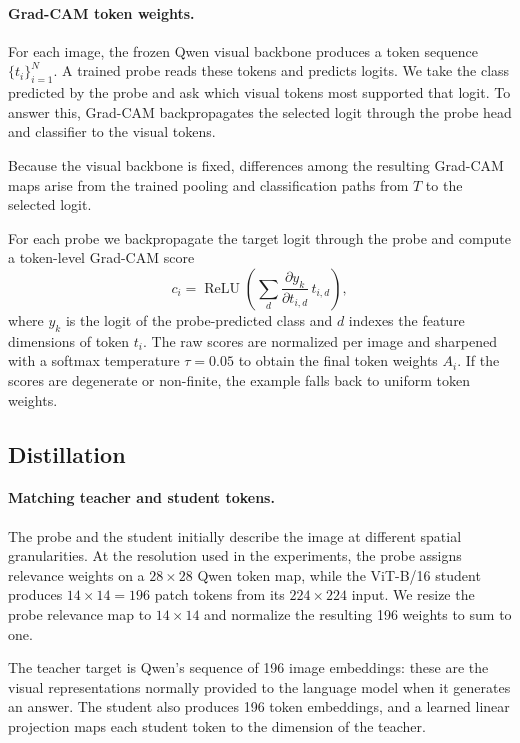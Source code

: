 \paragraph{Grad-CAM token weights.}
For each image, the frozen Qwen visual backbone produces a token sequence $\{t_i\}_{i=1}^N$.
A trained probe reads these tokens and predicts logits.
We take the class predicted by the probe and ask which visual tokens most supported that logit.
To answer this, Grad-CAM backpropagates the selected logit through the probe head and classifier to the visual tokens.

Because the visual backbone is fixed, differences among the resulting Grad-CAM maps arise from the trained pooling and classification paths from $T$ to the selected logit.

For each probe we backpropagate the target logit through the probe and compute a token-level Grad-CAM score
\begin{equation}
  c_i = \operatorname{ReLU}\left(\sum_d
  \frac{\partial y_k}{\partial t_{i,d}}\,t_{i,d}\right),
\end{equation}
where $y_k$ is the logit of the probe-predicted class and $d$ indexes the feature dimensions of token $t_i$.
The raw scores are normalized per image and sharpened with a softmax temperature $\tau=0.05$ to obtain the final token weights $A_i$.
If the scores are degenerate or non-finite, the example falls back to uniform token weights.

\subsection{Distillation}

\paragraph{Matching teacher and student tokens.}
The probe and the student initially describe the image at different spatial granularities.
At the resolution used in the experiments, the probe assigns relevance weights on a $28\times28$ Qwen token map, while the ViT-B/16 student produces $14\times14=196$ patch tokens from its $224\times224$ input.
We resize the probe relevance map to $14\times14$ and normalize the resulting 196 weights to sum to one.

The teacher target is Qwen's sequence of 196 image embeddings: these are the visual representations normally provided to the language model when it generates an answer.
The student also produces 196 token embeddings, and a learned linear projection maps each student token to the dimension of the teacher.

